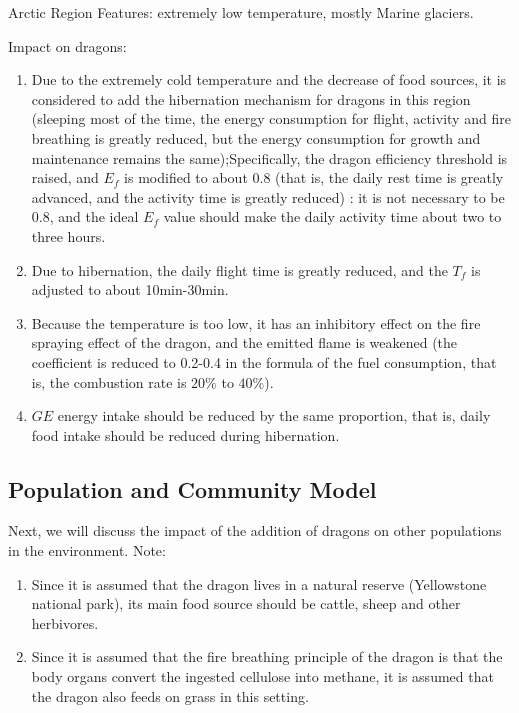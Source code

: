 \begin{defn}{Arctic Region}
 Features: extremely low temperature, mostly Marine glaciers.
\end{defn}
\noindent
Impact on dragons:
\begin{enumerate}[1]
    \item Due to the extremely cold temperature and the decrease of food sources, it is considered to add the hibernation mechanism for dragons in this region (sleeping most of the time, the energy consumption for flight, activity and fire breathing is greatly reduced, but the energy consumption for growth and maintenance remains the same);Specifically, the dragon efficiency threshold is raised, and $E_f$ is modified to about 0.8 (that is, the daily rest time is greatly advanced, and the activity time is greatly reduced) : it is not necessary to be 0.8, and the ideal $E_f$ value should make the daily activity time about two to three hours.
    \item Due to hibernation, the daily flight time is greatly reduced, and the $T_f$ is adjusted to about 10min-30min.
    \item Because the temperature is too low, it has an inhibitory effect on the fire spraying effect of the dragon, and the emitted flame is weakened (the coefficient is reduced to 0.2-0.4 in the formula of the fuel consumption, that is, the combustion rate is $20\%$ to $40\%$).
    \item $GE$ energy intake should be reduced by the same proportion, that is, daily food intake should be reduced during hibernation.
\end{enumerate}

\subsection{Population and Community Model}

Next, we will discuss the impact of the addition of dragons on other populations in the environment.
\noindent
Note:
\begin{enumerate}[(1)]
    \item Since it is assumed that the dragon lives in a natural reserve (Yellowstone national park), its main food source should be cattle, sheep and other herbivores.
    \item Since it is assumed that the fire breathing principle of the dragon is that the body organs convert the ingested cellulose into methane, it is assumed that the dragon also feeds on grass in this setting.
\end{enumerate}

